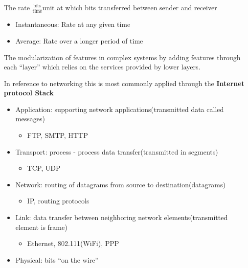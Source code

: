 \documentclass[12pt] {report}
\begin{document}
{
    The rate $\frac{\text{bits}}{\text{time}}\text{unit}$ at which bits transferred between sender and receiver
    \begin{itemize}
\item Instantaneous:
    Rate at any given time
\item Average:
    Rate over a longer period of time
    \end{itemize}
}
{
    The modularization of features in complex systems by adding features through each ``layer'' which relies on the services provided by lower layers.

    In reference to networking this is most commonly applied through the \textbf{Internet protocol Stack}
}
{
    \begin{itemize}
\item Application:
    supporting network applications(transmitted data called messages)
    \begin{itemize}
    \item FTP, SMTP, HTTP
    \end{itemize}

\item Transport:
    process - process data transfer(transmitted in segments)

    \begin{itemize}
    \item TCP, UDP
    \end{itemize}

\item Network:
    routing of datagrams from source to destination(datagrams)

    \begin{itemize}
    \item IP, routing protocols
    \end{itemize}

\item Link:
    data transfer between neighboring network elements(transmitted element is frame)

    \begin{itemize}
    \item Ethernet, 802.111(WiFi), PPP
    \end{itemize}

\item Physical:
    bits “on the wire”
    \end{itemize}
}
\end{document}
